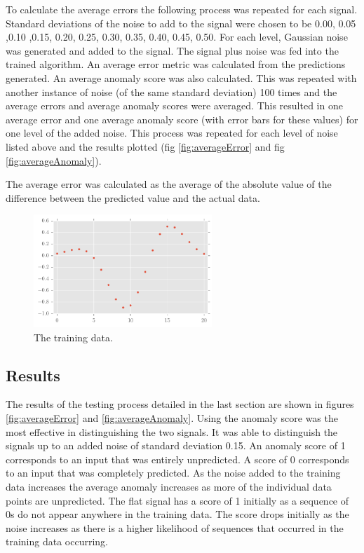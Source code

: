 \documentclass[a4paper]{jpconf}
\begin{document}
		To calculate the average errors the following process was repeated for each signal. Standard deviations of the noise to add to the signal were chosen to be 0.00, 0.05 ,0.10 ,0.15, 0.20, 0.25, 0.30, 0.35, 0.40, 0.45, 0.50. For each level, Gaussian noise was generated and added to the signal. The signal plus noise was fed into the trained algorithm. An average error metric was calculated from the predictions generated. An average anomaly score was also calculated. This was repeated with another instance of noise (of the same standard deviation) 100 times and the average errors and average anomaly scores were averaged. This resulted in one average error and one average anomaly score (with error bars for these values) for one level of the added noise. This process was repeated for each level of noise listed above and the results plotted (fig \ref{fig:averageError} and fig \ref{fig:averageAnomaly}).
		
		The average error was calculated as the average of the absolute value of the difference between the predicted value and the actual data.
		\begin{figure}
			\centering
			\includegraphics[width=0.6\textwidth]{trimmedGlitch1Plot.pdf}
			\caption{\label{fig:trimmedGlitch1}The training data.}
		\end{figure}
		
	\subsection{Results}
		The results of the testing process detailed in the last section are shown in figures \ref{fig:averageError} and \ref{fig:averageAnomaly}. Using the anomaly score was the most effective in distinguishing the two signals. It was able to distinguish the signals up to an added noise of standard deviation 0.15. 
		An anomaly score of 1 corresponds to an input that was entirely unpredicted. A score of 0 corresponds to an input that was completely predicted. As the noise added to the training data increases the average anomaly increases as more of the individual data points are unpredicted. The flat signal has a score of 1 initially as a sequence of 0s do not appear anywhere in the training data. The score drops initially as the noise increases as there is a higher likelihood of sequences that occurred in the training data occurring.
		
\end{document}
